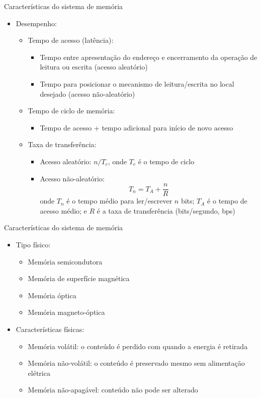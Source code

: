 \begin{slide}{Características do sistema de memória}
	\begin{itemize}
		\item Desempenho:
			\begin{itemize}
				\item Tempo de acesso (latência):
					\begin{itemize}
						\item Tempo entre apresentação do endereço e encerramento da operação de leitura ou escrita (acesso aleatório)
						\item Tempo para posicionar o mecanismo de leitura/escrita no local desejado (acesso não-aleatório)
					\end{itemize}
				\item Tempo de ciclo de memória:
					\begin{itemize}
						\item Tempo de acesso + tempo adicional para início de novo acesso
					\end{itemize}
				\item Taxa de transferência:
					\begin{itemize}
						\item Acesso aleatório: $n/T_c$, onde $T_c$ é o tempo de ciclo
						\item Acesso não-aleatório:
							\begin{equation*}
								T_n = T_A+\frac{n}{R}
							\end{equation*}
							onde $T_n$ é o tempo médio para ler/escrever $n$ bits; $T_A$ é o tempo de acesso médio; e $R$ é a taxa de transferência (bits/segundo, bps)
					\end{itemize}
			\end{itemize}
	\end{itemize}
\end{slide}

\begin{slide}{Características do sistema de memória}
	\begin{itemize}
		\item Tipo físico:
			\begin{itemize}
				\item Memória semicondutora
				\item Memória de superfície magnética
				\item Memória óptica
				\item Memória magneto-óptica
			\end{itemize}
		\item Características físicas:
			\begin{itemize}
				\item Memória volátil: o conteúdo é perdido com quando a energia é retirada
				\item Memória não-volátil: o conteúdo é preservado mesmo sem alimentação elétrica
				\item Memória não-apagável: conteúdo não pode ser alterado
			\end{itemize}
	\end{itemize}
\end{slide}

